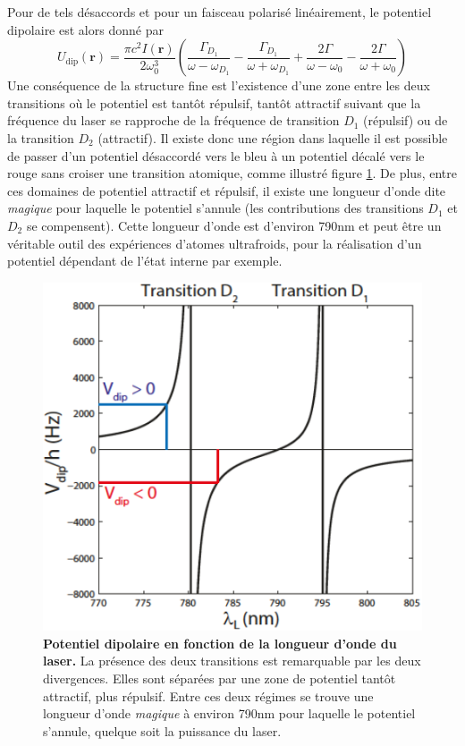 Pour de tels désaccords et pour un faisceau polarisé linéairement, le potentiel dipolaire est alors donné par
\begin{equation}
U_{\mathrm{dip}}(\mathbf{r})=\frac{\pi c^2 I(\mathbf{r})}{2\omega_0^3} \left( \frac{\Gamma_{D_1}}{\omega-\omega_{D_1}} - \frac{\Gamma_{D_1}}{\omega+\omega_{D_1}} + \frac{2\Gamma}{\omega-\omega_0}-\frac{2\Gamma}{\omega+\omega_0}\right)
\end{equation}
Une conséquence de la structure fine est l'existence d'une zone entre les deux transitions où le potentiel est tantôt répulsif, tantôt attractif suivant que la fréquence du laser se rapproche de la fréquence de transition $D_1$ (répulsif) ou de la transition $D_2$ (attractif). Il existe donc une région dans laquelle il est possible de passer d'un potentiel désaccordé vers le bleu à un potentiel décalé vers le rouge sans croiser une transition atomique, comme illustré figure \ref{fig:v_dip_magique}. De plus, entre ces domaines de potentiel attractif et répulsif, il existe une longueur d'onde dite \emph{magique} pour laquelle le potentiel s'annule (les contributions des transitions $D_1$ et $D_2$ se compensent). Cette longueur d'onde est d'environ 790nm et peut être un véritable outil des expériences d'atomes ultrafroids, pour la réalisation d'un potentiel dépendant de l'état interne par exemple.

\begin{figure}
\centering
\includegraphics[scale=0.6]{Fig/BEC_manip/V_dip.png}
\caption{\textbf{Potentiel dipolaire en fonction de la longueur d'onde du laser.} La présence des deux transitions est remarquable par les deux divergences. Elles sont séparées par une zone de potentiel tantôt attractif, plus répulsif. Entre ces deux régimes se trouve une longueur d'onde \emph{magique} à environ 790nm pour laquelle le potentiel s'annule, quelque soit la puissance du laser.}
\label{fig:v_dip_magique}
\end{figure}


